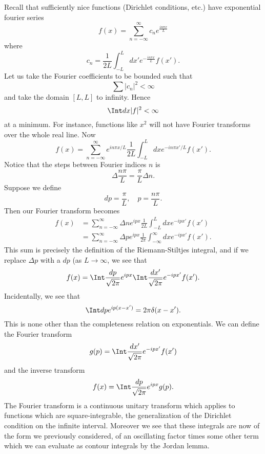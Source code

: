 Recall that sufficiently nice functions (Dirichlet conditions, etc.) have exponential fourier series
\begin{equation}
    f(x) = \sum_{n=-\infty}^\infty c_n e^{\frac{in\pi x}{L}}
\end{equation}
where
\begin{equation}
    c_n =\frac{1}{2L} \int_{-L}^L dx' e^{-\frac{in\pi x}{L}}f(x').
\end{equation}
Let us take the Fourier coefficients to be bounded such that
\begin{equation}
    \sum|c_n|^2 < \infty
\end{equation}
and take the domain $[L,L]$ to infinity. Hence
\begin{equation}
    \Int dx |f|^2 < \infty
\end{equation}
at a minimum. For instance, functions like $x^2$ will not have Fourier transforms over the whole real line. Now
\begin{equation}
    f(x) = \sum_{n=-\infty}^\infty e^{in\pi x/L} \frac{1}{2L} \int_{-L}^L dx e^{-in \pi x'/L}f(x').
\end{equation}
Notice that the steps between Fourier indices $n$ is
\begin{equation}
    \Delta \frac{n\pi}{L}= \frac{\pi}{L}\Delta n.
\end{equation}
Suppose we define
\begin{equation}
    dp =\frac{\pi}{L},\quad p = \frac{n\pi}{L}.
\end{equation}
Then our Fourier transform becomes
\begin{align*}
    f(x) &= \sum_{n=-\infty}^\infty \Delta n e^{i p x} \frac{1}{2L} \int_{-L}^L dx e^{-i p x'}f(x')\\
        &= \sum_{n=-\infty}^\infty \Delta p e^{ipx} \frac{1}{2\pi} \int_{-\infty}^\infty dx e^{-ip x'}f(x').
\end{align*}
This sum is precisely the definition of the Riemann-Stiltjes integral, and if we replace $\Delta p$ with a $dp$ (as $L\to \infty$, we see that
\begin{equation}
    f(x) = \Int \frac{dp}{\sqrt{2\pi}} e^{ipx} \Int \frac{dx'}{\sqrt{2\pi}}e^{-ipx'} f(x').
\end{equation}
Incidentally, we see that
\begin{equation}
    \Int dp e^{ip(x-x')} = 2\pi \delta(x-x').
\end{equation}
This is none other than the completeness relation on exponentials. We can define the Fourier transform
\begin{equation}
    g(p) = \Int \frac{dx'}{\sqrt{2\pi}} e^{-ipx'} f(x')
\end{equation}
and the inverse transform
\begin{equation}
    f(x) = \Int \frac{dp}{\sqrt{2\pi}} e^{ipx} g(p).
\end{equation}
The Fourier transform is a continuous unitary transform which applies to functions which are square-integrable, the generalization of the Dirichlet condition on the infinite interval. Moreover we see that these integrals are now of the form we previously considered, of an oscillating factor times some other term which we can evaluate as contour integrals by the Jordan lemma.

